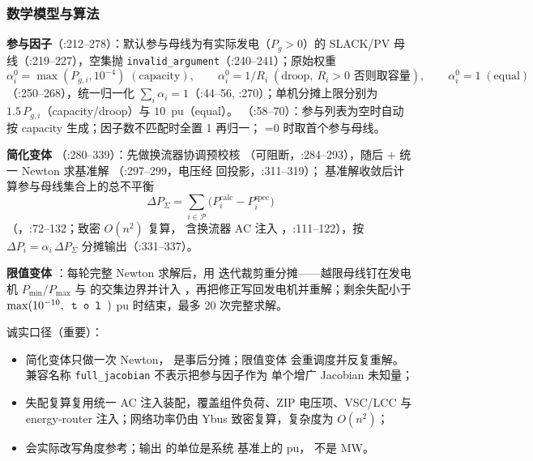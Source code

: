 \subsubsection*{数学模型与算法}
\textbf{参与因子}（:212--278）：默认参与母线为有实际发电（$P_g>0$）的 SLACK/PV
母线（:219--227），空集抛 \texttt{invalid\_argument}（:240--241）；原始权重
\[
\alpha_i^{0}=\max(P_{g,i},10^{-4})\;(\text{capacity}),\qquad
\alpha_i^{0}=1/R_i\;(\text{droop},\ R_i>0\text{ 否则取容量}),\qquad
\alpha_i^{0}=1\;(\text{equal})
\]
（:250--268），统一归一化 $\sum_i\alpha_i=1$（:44--56, :270）；单机分摊上限分别为
$1.5\,P_{g,i}$（capacity/droop）与 $10$~pu（equal）。
（:58--70）：参与列表为空时自动按 capacity 生成；因子数不匹配时全置 1 再归一；
=0 时取首个参与母线。

\textbf{简化变体} （:280--339）：先做换流器协调预校核
（可阻断，:284--293），随后  $+$ 统一 Newton 求基准解
（:297--299，电压经  回投影，:311--319）；
基准解收敛后计算参与母线集合上的总不平衡
\[
\Delta P_{\Sigma}=\sum_{i\in\mathcal P}\big(P_i^{\mathrm{calc}}-P_i^{\mathrm{spec}}\big)
\]
（，:72--132；致密 $O(n^2)$ 复算，
含换流器 AC 注入 ，:111--122），按
$\Delta P_i=\alpha_i\,\Delta P_{\Sigma}$ 分摊输出（:331--337）。

\textbf{限值变体} ：每轮完整 Newton 求解后，用
 迭代裁剪重分摊——越限母线钉在发电机
$P_{\min}/P_{\max}$ 与  的交集边界并计入
，再把修正写回发电机并重解；剩余失配小于
$\max(10^{-10},\fld{tol})$ pu 时结束，最多 20 次完整求解。

诚实口径（重要）：
\begin{itemize}
  \item 简化变体只做一次 Newton， 是事后分摊；限值变体
        会重调度并反复重解。兼容名称 \texttt{full\_jacobian} 不表示把参与因子作为
        单个增广 Jacobian 未知量；
  \item 失配复算复用统一 AC 注入装配，覆盖组件负荷、ZIP 电压项、VSC/LCC 与
        energy-router 注入；网络功率仍由 Ybus 致密复算，复杂度为 $O(n^2)$；
  \item {} 会实际改写角度参考；输出
         的单位是系统  基准上的 pu，
        不是 MW。
\end{itemize}

